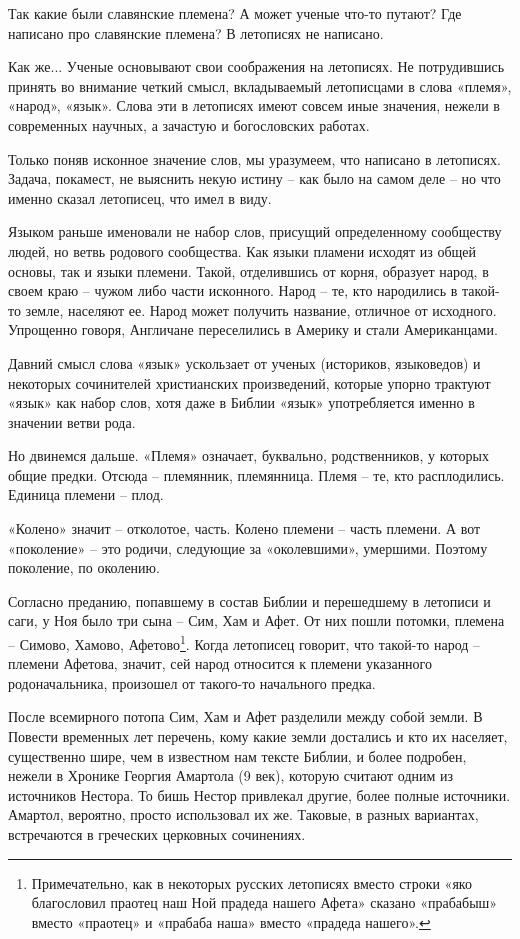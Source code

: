 Так какие были славянские племена? А может ученые что-то путают? Где написано про славянские племена? В летописях не написано.

Как же... Ученые основывают свои соображения на летописях. Не потрудившись принять во внимание четкий смысл, вкладываемый летописцами в слова «племя», «народ», «язык». Слова эти в летописях имеют совсем иные значения, нежели в современных научных, а зачастую и богословских работах.

Только поняв исконное значение слов, мы уразумеем, что написано в летописях. Задача, покамест, не выяснить некую истину – как было на самом деле – но что именно сказал летописец, что имел в виду.

Языком раньше именовали не набор слов, присущий определенному сообществу людей, но ветвь родового сообщества. Как языки пламени исходят из общей основы, так и языки племени. Такой, отделившись от корня, образует народ, в своем краю – чужом либо части исконного. Народ – те, кто народились в такой-то земле, населяют ее. Народ может получить название, отличное от исходного. Упрощенно говоря, Англичане переселились в Америку и стали Американцами.

Давний смысл слова «язык» ускользает от ученых (историков, языковедов) и некоторых сочинителей христианских произведений, которые упорно трактуют «язык» как набор слов, хотя даже в Библии «язык» употребляется именно в значении ветви рода.

Но двинемся дальше. «Племя» означает, буквально, родственников, у которых общие предки. Отсюда – племянник, племянница. Племя – те, кто расплодились. Единица племени – плод.

«Колено» значит – отколотое, часть. Колено племени – часть племени. А вот «поколение» – это родичи, следующие за «околевшими», умершими. Поэтому поколение, по околению.

Согласно преданию, попавшему в состав Библии и перешедшему в летописи и саги, у Ноя было три сына – Сим, Хам и Афет. От них пошли потомки, племена – Симово, Хамово, Афетово\footnote{Примечательно, как в некоторых русских летописях вместо строки «яко благословил праотец наш Ной прадеда нашего Афета» сказано «прабабыш» вместо «праотец» и «прабаба наша» вместо «прадеда нашего».}. Когда летописец говорит, что такой-то народ – племени Афетова, значит, сей народ относится к племени указанного родоначальника, произошел от такого-то начального предка.

После всемирного потопа Сим, Хам и Афет разделили между собой земли. В Повести временных лет перечень, кому какие земли достались и кто их населяет, существенно шире, чем в известном нам тексте Библии, и более подробен, нежели в Хронике Георгия Амартола (9 век), которую считают одним из источников Нестора. То бишь Нестор привлекал другие, более полные источники. Амартол, вероятно, просто использовал их же. Таковые, в разных вариантах, встречаются в греческих церковных сочинениях.

